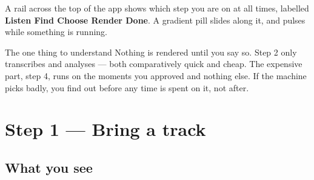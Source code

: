 \documentclass[11pt,a4paper]{article}
\begin{document}
\vspace{14pt}
\begin{center}
\end{center}

\vspace{10pt}
A rail across the top of the app shows which step you are on at all times,
labelled \textbf{Listen \textperiodcentered{} Find \textperiodcentered{}
Choose \textperiodcentered{} Render \textperiodcentered{} Done}. A gradient
pill slides along it, and pulses while something is running.

\begin{note}{The one thing to understand}
Nothing is rendered until you say so. Step 2 only transcribes and analyses ---
both comparatively quick and cheap. The expensive part, step 4, runs on the
moments you approved and nothing else. If the machine picks badly, you find
out before any time is spent on it, not after.
\end{note}

\section{Step 1 --- Bring a track}

\subsection{What you see}
\end{document}
